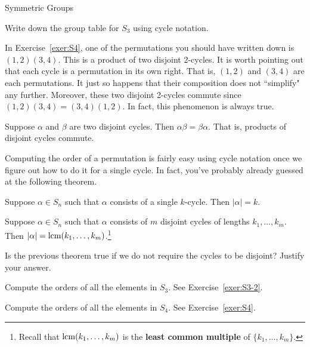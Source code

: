 \begin{section}{Symmetric Groups}
\begin{exercise}
Write down the group table for $S_3$ using cycle notation.
\end{exercise}

In Exercise~\ref{exer:S4}, one of the permutations you should have written down is $(1,2)(3,4)$.  This is a product of two disjoint 2-cycles.  It is worth pointing out that each cycle is a permutation in its own right.  That is, $(1,2)$ and $(3,4)$ are each permutations.  It just so happens that their composition does not ``simplify" any further.  Moreover, these two disjoint 2-cycles commute since $(1,2)(3,4)=(3,4)(1,2)$.  In fact, this phenomenon is always true.

\begin{theorem}
Suppose $\alpha$ and $\beta$ are two disjoint cycles.  Then $\alpha\beta=\beta\alpha$.  That is, products of disjoint cycles commute.
\end{theorem}

Computing the order of a permutation is fairly easy using cycle notation once we figure out how to do it for a single cycle.  In fact, you've probably already guessed at the following theorem.

\begin{theorem}
Suppose $\alpha\in S_n$ such that $\alpha$ consists of a single $k$-cycle.  Then $|\alpha|=k$.
\end{theorem}

\begin{theorem}
Suppose $\alpha\in S_n$ such that $\alpha$ consists of $m$ disjoint cycles of lengths $k_1,\ldots, k_m$.  Then $|\alpha|=\operatorname{lcm}(k_1,\ldots, k_m)$.\footnote{Recall that $\operatorname{lcm}(k_1,\ldots, k_m)$ is the \textbf{least common multiple} of $\{k_1,\ldots, k_m\}$.} 
\end{theorem}

\begin{problem}
Is the previous theorem true if we do not require the cycles to be disjoint?  Justify your answer.
\end{problem}

\begin{exercise}
Compute the orders of all the elements in $S_3$.  See Exercise~\ref{exer:S3-2}.
\end{exercise}

\begin{exercise}
Compute the orders of all the elements in $S_4$.  See Exercise~\ref{exer:S4}.
\end{exercise}


\end{section}

